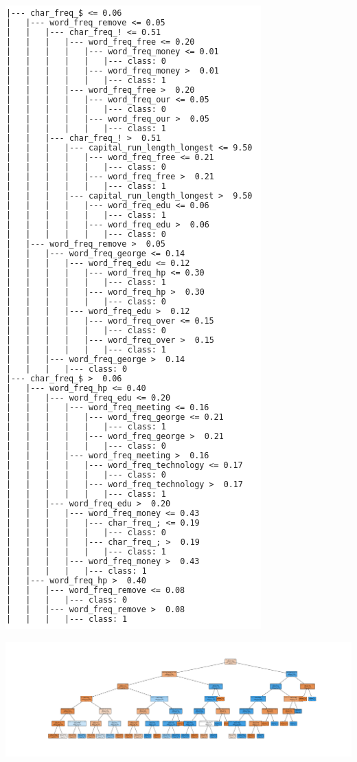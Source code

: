 \documentclass[twoside,10pt]{article}
\begin{document}
\begin{enumerate}
\begin{enumerate}
\includegraphics[scale=0.5]{spam_text_tree}

\includegraphics[scale=0.2]{spam_tree}


\end{enumerate}
\end{enumerate}
\end{document}
